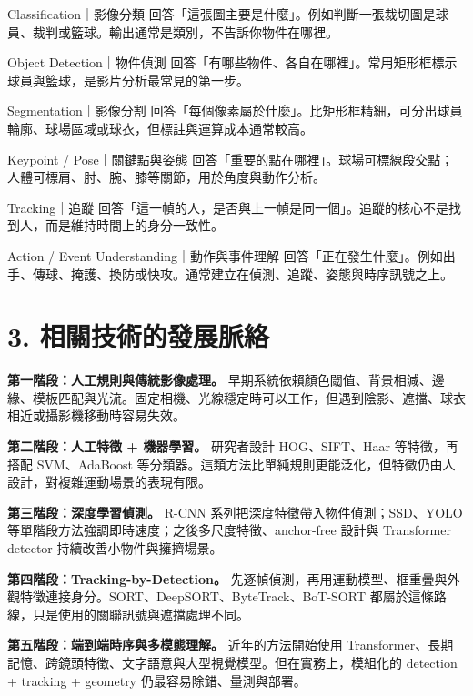 \documentclass[11pt,a4paper,oneside]{report}
\begin{document}
\begin{tcbraster}[raster columns=2,raster equal height=rows,raster column skip=7pt,raster row skip=7pt]
\begin{termBox}{Classification｜影像分類}
回答「這張圖主要是什麼」。例如判斷一張裁切圖是球員、裁判或籃球。輸出通常是類別，不告訴你物件在哪裡。
\end{termBox}
\begin{termBox}{Object Detection｜物件偵測}
回答「有哪些物件、各自在哪裡」。常用矩形框標示球員與籃球，是影片分析最常見的第一步。
\end{termBox}
\begin{termBox}{Segmentation｜影像分割}
回答「每個像素屬於什麼」。比矩形框精細，可分出球員輪廓、球場區域或球衣，但標註與運算成本通常較高。
\end{termBox}
\begin{termBox}{Keypoint / Pose｜關鍵點與姿態}
回答「重要的點在哪裡」。球場可標線段交點；人體可標肩、肘、腕、膝等關節，用於角度與動作分析。
\end{termBox}
\begin{termBox}{Tracking｜追蹤}
回答「這一幀的人，是否與上一幀是同一個」。追蹤的核心不是找到人，而是維持時間上的身分一致性。
\end{termBox}
\begin{termBox}{Action / Event Understanding｜動作與事件理解}
回答「正在發生什麼」。例如出手、傳球、掩護、換防或快攻。通常建立在偵測、追蹤、姿態與時序訊號之上。
\end{termBox}
\end{tcbraster}

\section*{3. 相關技術的發展脈絡}

\begin{historyBox}
\textbf{第一階段：人工規則與傳統影像處理。}\quad
早期系統依賴顏色閾值、背景相減、邊緣、模板匹配與光流。固定相機、光線穩定時可以工作，但遇到陰影、遮擋、球衣相近或攝影機移動時容易失效。

\textbf{第二階段：人工特徵 + 機器學習。}\quad
研究者設計 HOG、SIFT、Haar 等特徵，再搭配 SVM、AdaBoost 等分類器。這類方法比單純規則更能泛化，但特徵仍由人設計，對複雜運動場景的表現有限。

\textbf{第三階段：深度學習偵測。}\quad
R-CNN 系列把深度特徵帶入物件偵測；SSD、YOLO 等單階段方法強調即時速度；之後多尺度特徵、anchor-free 設計與 Transformer detector 持續改善小物件與擁擠場景。

\textbf{第四階段：Tracking-by-Detection。}\quad
先逐幀偵測，再用運動模型、框重疊與外觀特徵連接身分。SORT、DeepSORT、ByteTrack、BoT-SORT 都屬於這條路線，只是使用的關聯訊號與遮擋處理不同。

\textbf{第五階段：端到端時序與多模態理解。}\quad
近年的方法開始使用 Transformer、長期記憶、跨鏡頭特徵、文字語意與大型視覺模型。但在實務上，模組化的 detection + tracking + geometry 仍最容易除錯、量測與部署。
\end{historyBox}
\end{document}
